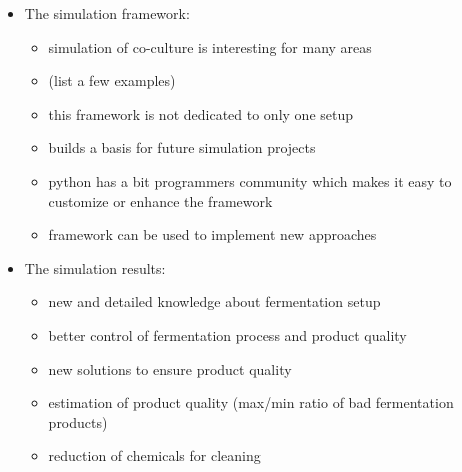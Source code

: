 \begin{itemize}
 \item The simulation framework:
 \begin{itemize}
  \item simulation of co-culture is interesting for many areas
  \item (list a few examples)
  \item this framework is not dedicated to only one setup
  \item builds a basis for future simulation projects
  \item python has a bit programmers community which makes it easy to customize or enhance the framework
  \item framework can be used to implement new approaches
 \end{itemize}
 \item The simulation results:
 \begin{itemize}
  \item new and detailed knowledge about fermentation setup
  \item better control of fermentation process and product quality
  \item new solutions to ensure product quality
  \item estimation of product quality (max/min ratio of bad fermentation products)
  \item reduction of chemicals for cleaning
 \end{itemize}
\end{itemize}


